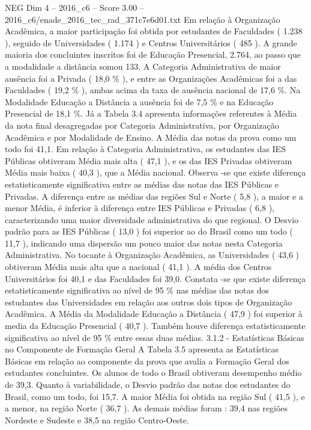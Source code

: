 \begin{textsample}{NEG Dim 4 – 2016\_c6 – Score 3.00 – 2016\_c6/enade\_2016\_tec\_rad\_371c7e6d01.txt}
Em relação à Organização Acadêmica, a maior participação foi obtida por estudantes de Faculdades ( 1.238 ), seguido de Universidades ( 1.174 ) e Centros Universitários ( 485 ).
A grande maioria dos concluintes inscritos foi de Educação Presencial, 2.764, ao passo que a modalidade a distância somou 133.
A Categoria Administrativa de maior ausência foi a Privada ( 18,0 \% ), e entre as Organizações Acadêmicas foi a das Faculdades ( 19,2 \% ), ambas acima da taxa de ausência nacional de 17,6 \%.
Na Modalidade Educação a Distância a ausência foi de 7,5 \% e na Educação Presencial de 18,1 \%.
Já a Tabela 3.4 apresenta informações referentes à Média da nota final desagregadas por Categoria Administrativa, por Organização Acadêmica e por Modalidade de Ensino.
A Média das notas da prova como um todo foi 41,1.
Em relação à Categoria Administrativa, os estudantes das IES Públicas obtiveram Média mais alta ( 47,1 ), e os das IES Privadas obtiveram Média mais baixa ( 40,3 ), que a Média nacional.
Observa -se que existe diferença estatisticamente significativa entre as médias das notas das IES Públicas e Privadas.
A diferença entre as médias das regiões Sul e Norte ( 5,8 ), a maior e a menor Média, é inferior à diferença entre IES Públicas e Privadas ( 6,8 ), caracterizando uma maior diversidade administrativa do que regional.
O Desvio padrão para as IES Públicas ( 13,0 ) foi superior ao do Brasil como um todo ( 11,7 ), indicando uma dispersão um pouco maior das notas nesta Categoria Administrativa.
No tocante à Organização Acadêmica, as Universidades ( 43,6 ) obtiveram Média mais alta que a nacional ( 41,1 ).
A média dos Centros Universitários foi 40,1 e das Faculdades foi 39,0.
Constata -se que existe diferença estatisticamente significativa ao nível de 95 \% nas médias das notas dos estudantes das Universidades em relação aos outros dois tipos de Organização Acadêmica.
A Média da Modalidade Educação a Distância ( 47,9 ) foi superior à media da Educação Presencial ( 40,7 ).
Também houve diferença estatisticamente significativa ao nível de 95 \% entre essas duas médias. 3.1.2 - Estatísticas Básicas no Componente de Formação Geral A Tabela 3.5 apresenta as Estatísticas Básicas em relação ao componente da prova que avalia a Formação Geral dos estudantes concluintes.
Os alunos de todo o Brasil obtiveram desempenho médio de 39,3.
Quanto à variabilidade, o Desvio padrão das notas dos estudantes do Brasil, como um todo, foi 15,7.
A maior Média foi obtida na região Sul ( 41,5 ), e a menor, na região Norte ( 36,7 ).
As demais médias foram : 39,4 nas regiões Nordeste e Sudeste e 38,5 na região Centro-Oeste.

\end{textsample}
